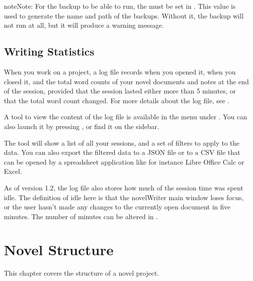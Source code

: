 \documentclass[a4paper,11pt,english]{sphinxmanual}
\begin{document}
\begin{sphinxadmonition}{note}{Note:}
\sphinxAtStartPar
For the backup to be able to run, the  must be set in . This
value is used to generate the name and path of the backups. Without it, the backup will not run
at all, but it will produce a warning message.
\end{sphinxadmonition}


\section{Writing Statistics}
\label{\detokenize{project_overview:writing-statistics}}\label{\detokenize{project_overview:a-proj-stats}}
\sphinxAtStartPar
When you work on a project, a log file records when you opened it, when you closed it, and the
total word counts of your novel documents and notes at the end of the session, provided that the
session lasted either more than 5 minutes, or that the total word count changed. For more details
about the log file, see {\hyperref[\detokenize{tech_storage:a-storage}]{}}.

\sphinxAtStartPar
A tool to view the content of the log file is available in the  menu under . You can also launch it by pressing , or find it on the sidebar.

\sphinxAtStartPar
The tool will show a list of all your sessions, and a set of filters to apply to the data. You can
also export the filtered data to a JSON file or to a CSV file that can be opened by a spreadsheet
application like for instance Libre Office Calc or Excel.

\sphinxAtStartPar
{}As of version 1.2, the log file also stores how much of the session time was spent idle. The
definition of idle here is that the novelWriter main window loses focus, or the user hasn’t made
any changes to the currently open document in five minutes. The number of minutes can be altered
in .

\sphinxstepscope


\chapter{Novel Structure}
\label{\detokenize{project_structure:novel-structure}}\label{\detokenize{project_structure:a-struct}}\label{\detokenize{project_structure::doc}}
\sphinxAtStartPar
This chapter covers the structure of a novel project.
\end{document}
